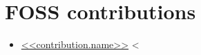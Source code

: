\section{FOSS contributions}
\begin{itemize}
    <%
     \item \href{<<contribution.url>>}{<<contribution.name>>}
    <%
\end{itemize}
